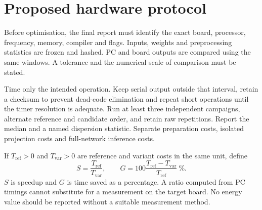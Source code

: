 \documentclass[preprint,11pt,a4paper]{elsarticle}
\begin{document}
\section{Proposed hardware protocol}
Before optimisation, the final report must identify the exact board, processor, frequency, memory, compiler and flags. Inputs, weights and preprocessing statistics are frozen and hashed. PC and board outputs are compared using the same windows. A tolerance and the numerical scale of comparison must be stated.

Time only the intended operation. Keep serial output outside that interval, retain a checksum to prevent dead-code elimination and repeat short operations until the timer resolution is adequate. Run at least three independent campaigns, alternate reference and candidate order, and retain raw repetitions. Report the median and a named dispersion statistic. Separate preparation costs, isolated projection costs and full-network inference costs.

If $T_{\mathrm{ref}}>0$ and $T_{\mathrm{var}}>0$ are reference and variant costs in the same unit, define
\begin{equation}
S=\frac{T_{\mathrm{ref}}}{T_{\mathrm{var}}},\qquad
G=100\frac{T_{\mathrm{ref}}-T_{\mathrm{var}}}{T_{\mathrm{ref}}}\ \%.
\end{equation}
$S$ is speedup and $G$ is time saved as a percentage. A ratio computed from PC timings cannot substitute for a measurement on the target board. No energy value should be reported without a suitable measurement method.
\end{document}
